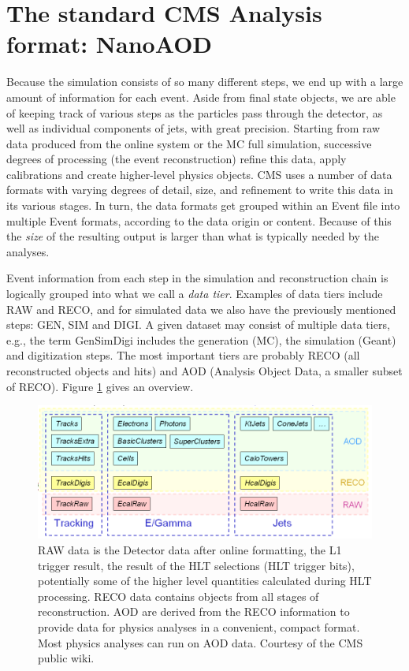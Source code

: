 \section{The standard CMS Analysis format: NanoAOD}

Because the simulation consists of so many different steps, we end up with a large amount of information for each event. Aside from final state objects, we are able of keeping track of various steps as the particles pass through the detector, as well as individual components of jets, with great precision. Starting from raw data produced from the online system or the MC full simulation, successive degrees of processing (the event reconstruction) refine this data, apply calibrations and create higher-level physics objects. CMS uses a number of data formats with varying degrees of detail, size, and refinement to write this data in its various stages. In turn, the data formats get grouped within an Event file into multiple Event formats, according to the data origin or content. Because of this the \emph{size} of the resulting output is larger than what is typically needed by the analyses.

Event information from each step in the simulation and reconstruction chain is logically grouped into what we call a \emph{data tier}. Examples of data tiers include RAW and RECO, and for simulated data we also have the previously mentioned steps: GEN, SIM and DIGI. A given dataset may consist of multiple data tiers, e.g., the term GenSimDigi includes the generation (MC), the simulation (Geant) and digitization steps. The most important tiers are probably RECO (all reconstructed objects and hits) and AOD (Analysis Object Data, a smaller subset of RECO). Figure \ref{fig:datatier} gives an overview. 

\begin{figure}
    \centering
     \includegraphics[width=\columnwidth]{gfx/ch2/whats_in_aod_reco.png}
    \caption[Data Tiers]{RAW data is the Detector data after online formatting, the L1 trigger result, the result of the HLT selections (HLT trigger bits), potentially some of the higher level quantities calculated during HLT processing. RECO data contains objects from all stages of reconstruction. AOD are derived from the RECO information to provide data for physics analyses in a convenient, compact format. Most physics analyses can run on AOD data. Courtesy of the CMS public wiki.}
    \label{fig:datatier}
\end{figure}

